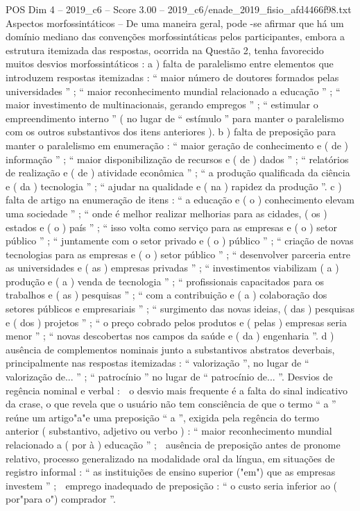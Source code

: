 \begin{textsample}{POS Dim 4 – 2019\_c6 – Score 3.00 – 2019\_c6/enade\_2019\_fisio\_afd4466f98.txt}
Aspectos morfossintáticos – De uma maneira geral, pode -se afirmar que há um domínio mediano das convenções morfossintáticas pelos participantes, embora a estrutura itemizada das respostas, ocorrida na Questão 2, tenha favorecido muitos desvios morfossintáticos : a ) falta de paralelismo entre elementos que introduzem respostas itemizadas : “ maior número de doutores formados pelas universidades ” ; “ maior reconhecimento mundial relacionado a educação ” ; “ maior investimento de multinacionais, gerando empregos ” ; “ estimular o empreendimento interno ” ( no lugar de “ estímulo ” para manter o paralelismo com os outros substantivos dos itens anteriores ). b ) falta de preposição para manter o paralelismo em enumeração : “ maior geração de conhecimento e ( de ) informação ” ; “ maior disponibilização de recursos e ( de ) dados ” ; “ relatórios de realização e ( de ) atividade econômica ” ; “ a produção qualificada da ciência e ( da ) tecnologia ” ; “ ajudar na qualidade e ( na ) rapidez da produção ”. c ) falta de artigo na enumeração de itens : “ a educação e ( o ) conhecimento elevam uma sociedade ” ; “ onde é melhor realizar melhorias para as cidades, ( os ) estados e ( o ) país ” ; “ isso volta como serviço para as empresas e ( o ) setor público ” ; “ juntamente com o setor privado e ( o ) público ” ; “ criação de novas tecnologias para as empresas e ( o ) setor público ” ; “ desenvolver parceria entre as universidades e ( as ) empresas privadas ” ; “ investimentos viabilizam ( a ) produção e ( a ) venda de tecnologia ” ; “ profissionais capacitados para os trabalhos e ( as ) pesquisas ” ; “ com a contribuição e ( a ) colaboração dos setores públicos e empresariais ” ; “ surgimento das novas ideias, ( das ) pesquisas e ( dos ) projetos ” ; “ o preço cobrado pelos produtos e ( pelas ) empresas seria menor ” ; “ novas descobertas nos campos da saúde e ( da ) engenharia ”. d ) ausência de complementos nominais junto a substantivos abstratos deverbais, principalmente nas respostas itemizadas : “ valorização ”, no lugar de “ valorização de... ” ; “ patrocínio ” no lugar de “ patrocínio de... ”.
Desvios de regência nominal e verbal :  o desvio mais frequente é a falta do sinal indicativo da crase, o que revela que o usuário não tem consciência de que o termo “ a ” reúne um artigo"a"e uma preposição “ a ”, exigida pela regência do termo anterior ( substantivo, adjetivo ou verbo ) : “ maior reconhecimento mundial relacionado a ( por à ) educação ” ;  ausência de preposição antes de pronome relativo, processo generalizado na modalidade oral da língua, em situações de registro informal : “ as instituições de ensino superior ("em") que as empresas investem ” ;  emprego inadequado de preposição : “ o custo seria inferior ao ( por"para o") comprador ”.

\end{textsample}

